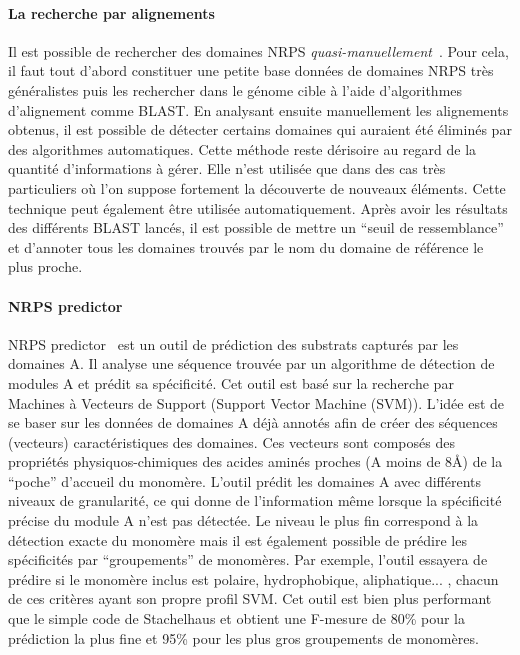 \documentclass[12pt,french,twoside]{report}
\begin{document}
\paragraph{La recherche par alignements}
Il est possible de rechercher des domaines NRPS \textit{quasi-manuellement}~\cite{bachmann_chapter_2009}.
Pour cela, il faut tout d'abord constituer une petite base données de domaines NRPS très généralistes puis les rechercher dans le génome cible à l'aide d'algorithmes d'alignement comme BLAST.
En analysant ensuite manuellement les alignements obtenus, il est possible de détecter certains domaines qui auraient été éliminés par des algorithmes automatiques.
Cette méthode reste dérisoire au regard de la quantité d'informations à gérer.
Elle n'est utilisée que dans des cas très particuliers où l'on suppose fortement la découverte de nouveaux éléments.
Cette technique peut également être utilisée automatiquement.
Après avoir les résultats des différents BLAST lancés, il est possible de mettre un ``seuil de ressemblance'' et d'annoter tous les domaines trouvés par le nom du domaine de référence le plus proche.

\paragraph{NRPS predictor}
NRPS predictor~\cite{rottig_nrpspredictor2web_2011,rausch_specificity_2005} est un outil de prédiction des substrats capturés par les domaines A.
Il analyse une séquence trouvée par un algorithme de détection de modules A et prédit sa spécificité.
Cet outil est basé sur la recherche par Machines à Vecteurs de Support (Support Vector Machine (SVM)).
L'idée est de se baser sur les données de domaines A déjà annotés afin de créer des séquences (vecteurs) caractéristiques des domaines.
Ces vecteurs sont composés des propriétés physiquos-chimiques des acides aminés proches (A moins de 8Å) de la ``poche'' d'accueil du monomère.
L'outil prédit les domaines A avec différents niveaux de granularité, ce qui donne de l'information même lorsque la spécificité précise du module A n'est pas détectée.
Le niveau le plus fin correspond à la détection exacte du monomère mais il est également possible de prédire les spécificités par ``groupements'' de monomères.
Par exemple, l'outil essayera de prédire si le monomère inclus est polaire, hydrophobique, aliphatique... , chacun de ces critères ayant son propre profil SVM.
Cet outil est bien plus performant que le simple code de Stachelhaus et obtient une F-mesure de 80\% pour la prédiction la plus fine et 95\% pour les plus gros groupements de monomères.
\end{document}
